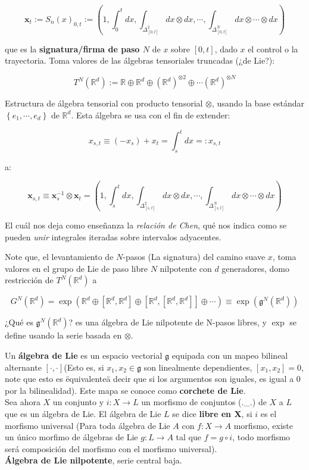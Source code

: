 \[
	\mathbf{x}_t := S_n (x)_{0, t} := \left( 1, \int_0^t dx, \int_{\Delta_{[0,t]}^2 } dx \otimes dx, \cdots, \int_{ \Delta_{[0,t]}^N  } dx \otimes \cdots \otimes dx \right)
\]

que es la \textbf{signatura/firma de paso $N$} de $x$ sobre $[0,t]$, dado $x$ el control o la trayectoria. Toma valores de las álgebras tensoriales truncadas (¿de Lie?):

\[
	T^N (\mathbb{R}^d) := \mathbb{R} \oplus \mathbb{R}^d \oplus \left( \mathbb{R}^d \right)^{\otimes 2} \oplus \cdots (\mathbb{R}^d)^{\otimes N}
\]

Estructura de álgebra tensorial con producto tensorial $\otimes$, usando la base estándar $\left\{ e_1, \cdots, e_d \right\}$ de $\mathbb{R}^d$. Esta álgebra se usa con el fin de extender:

\[
	x_{s,t} \equiv (-x_s) + x_t = \int_s^t dx =: x_{s,t}
\]


a:

\[
	\mathbf{x}_{s,t} \equiv \mathbf{x}_s^{-1} \otimes \mathbf{x}_t = \left( 1, \int_s^t dx, \int_{ \Delta_{[s,t]}^2 } dx \otimes dx, \cdots, \int_{ \Delta_{[s,t]}^N } dx \otimes \cdots \otimes dx \right)
\]

El cuál nos deja como enseñanza la \textit{relación de Chen}, qué nos indica como se pueden \textit{unir} integrales iteradas sobre intervalos adyacentes. 

Note que, el levantamiento de $N$-pasos (La signatura) del camino suave $x$, toma valores en el grupo de Lie de paso libre $N$ nilpotente con $d$ generadores, domo restricción de $T^N (\mathbb{R}^d)$ a 

\[
	G^N (\mathbb{R}^d) = \exp \left( \mathbb{R}^d \oplus \left[ \mathbb{R}^d, \mathbb{R}^d \right] \oplus \left[ \mathbb{R}^d, \left[ \mathbb{R}^d, \mathbb{R}^d \right] \right] \oplus \cdots \right) \equiv \exp( \mathfrak{g}^N (\mathbb{R}^d) )
\]

¿Qué es $\mathfrak{g}^N (\mathbb{R}^d)$? es una álgebra de Lie nilpotente de N-pasos libres, y $\exp$ se define usando la serie basada en $\otimes$.

\begin{boxDef}
	Un \textbf{álgebra de Lie} es un espacio vectorial $\mathfrak{g}$ equipada con un mapeo bilineal alternante $[\cdot, \cdot] $(Esto es, si $x_1, x_2 \in \mathfrak{g}$ son linealmente dependientes, $[x_1, x_2] = 0$, note que esto es \"equivalente\" a decir que si los argumentos son iguales, es igual a 0 por la bilinealidad). Este mapa se conoce como \textbf{corchete de Lie}. \\

	Sea ahora $X$ un conjunto y $i: X \rightarrow L$ un morfismo de conjuntos (.\_.) de $X$ a $L$ que es un álgebra de Lie. El álgebra de Lie $L$ se dice \textbf{libre en X}, si $i$ es el morfismo universal (Para toda álgebra de Lie $A$ con $f: X \rightarrow A$ morfismo, existe un único morfimo de álgebras de Lie $g: L \rightarrow A$ tal que $f = g \circ i$, todo morfismo será composición del morfismo con el morfismo universal). \\

	\textbf{Álgebra de Lie nilpotente}, serie central baja.
\end{boxDef}


